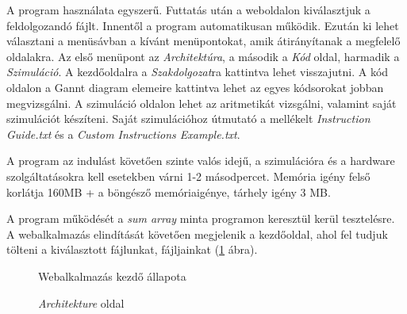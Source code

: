 
A program használata egyszerű. Futtatás után a weboldalon kiválasztjuk a feldolgozandó fájlt. Innentől a program automatikusan működik. Ezután ki lehet választani a menüsávban a kívánt menüpontokat, amik átirányítanak a megfelelő oldalakra. Az első menüpont az \textit{Architektúra}, a második a \textit{Kód} oldal, harmadik a \textit{Szimuláció}. A kezdőoldalra a \textit{Szakdolgozat}ra kattintva lehet visszajutni. A kód oldalon a Gannt diagram elemeire kattintva lehet az egyes kódsorokat jobban megvizsgálni. A szimuláció oldalon lehet az aritmetikát vizsgálni, valamint saját szimulációt készíteni. Saját szimulációhoz útmutató a mellékelt \textit{Instruction Guide.txt} és a \textit{Custom Instructions Example.txt}.

A program az indulást követően szinte valós idejű, a szimulációra és a hardware szolgáltatásokra kell esetekben várni 1-2 másodpercet. Memória igény felső korlátja 160MB + a böngésző memóriaigénye, tárhely igény 3 MB.

A program működését a \textit{sum array} minta programon keresztül kerül tesztelésre. A webalkalmazás elindítását követően megjelenik a kezdőoldal, ahol fel tudjuk tölteni a kiválasztott fájlunkat, fájljainkat (\ref{fig:start} ábra).

\begin{figure}[h]
\centering
{}
\caption{Webalkalmazás kezdő állapota}
\label{fig:start}
\end{figure}

\begin{figure}[h]
\centering
{}
\caption{\textit{Architekture} oldal}
\label{fig:arch}
\end{figure}

